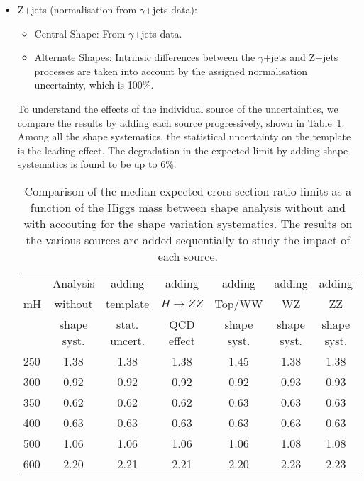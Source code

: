 \begin{itemize}
    \item Z+jets (normalisation from $\gamma$+jets data):
    \begin{itemize}
        \item Central Shape: From $\gamma$+jets data.
        \item Alternate Shapes: Intrinsic differences between the $\gamma$+jets and Z+jets processes
are taken into account by the assigned normalisation uncertainty, which is 100\%.
    \end{itemize}

\vspace{15pt}

To understand the effects of the individual source of the uncertainties,
we compare the results by adding each source progressively, shown in Table~\ref{tab:mva_mtshape_detail}.
Among all the shape systematics, the statistical uncertainty on the template is the leading effect.
The degradation in the expected limit by adding shape systematics is found to be up to $6\%$.



\begin{table}[!ht]
\begin{center}
{\normalsize
\begin{tabular}{|l|c|ccccc|}
\hline
      &  Analysis    & adding          &  adding      &  adding      & adding      & adding \\
mH  &  without     & template        &  $H\to ZZ$   &  Top/WW             & WZ          & ZZ \\
      &  shape syst. & stat. uncert.   &  QCD effect &  shape syst. & shape syst. & shape syst. \\
\hline
250 & 1.38 & 1.38 & 1.38 & 1.45 & 1.38 & 1.38 \\   
300 & 0.92 & 0.92 & 0.92 & 0.92 & 0.93 & 0.93 \\ 
350 & 0.62 & 0.62 & 0.62 & 0.63 & 0.63 & 0.63 \\
400 & 0.63 & 0.63 & 0.63 & 0.63 & 0.63 & 0.63 \\
500 & 1.06 & 1.06 & 1.06 & 1.06 & 1.08 & 1.08 \\
600 & 2.20 & 2.21 & 2.21 & 2.20 & 2.23 & 2.23 \\
\hline
\end{tabular}
}
\caption{Comparison of the median expected cross section ratio limits as a function 
of the Higgs mass between shape analysis without and with accouting for the 
shape variation systematics. The results on the various sources are added sequentially 
to study the impact of each source. } 
\label{tab:mva_mtshape_detail}
\end{center}
\end{table}

\end{itemize}

